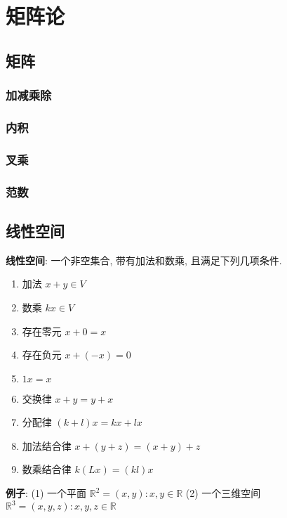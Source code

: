 \documentclass{article}
\begin{document}
\section{矩阵论}
    \subsection{矩阵}
        \subsubsection{加减乘除}

        \subsubsection{内积}

        \subsubsection{叉乘}

        \subsubsection{范数}


    \subsection{线性空间}
        \textbf{线性空间}: 一个非空集合, 带有加法和数乘, 且满足下列几项条件.
            \begin{enumerate}
                \item 加法   $x+y \in V$
                \item 数乘   $k x \in V$
                \item 存在零元 $x+0=x$
                \item 存在负元 $x+(-x) = 0$
                \item $1x = x$
                \item 交换律 $x+y = y+x$
                \item 分配律 $(k+l)x = kx+lx$
                \item 加法结合律 $x+(y+z) = (x+y) +z$
                \item 数乘结合律 $k(Lx) = (kl)x$
            \end{enumerate}
            
            \textbf{例子}:
                (1) 一个平面 $\mathbb R^2 = {(x,y): x, y\in \mathbb R}$
                (2) 一个三维空间 $\mathbb R^3 = {(x,y,z): x, y, z\in \mathbb R}$
\end{document}
